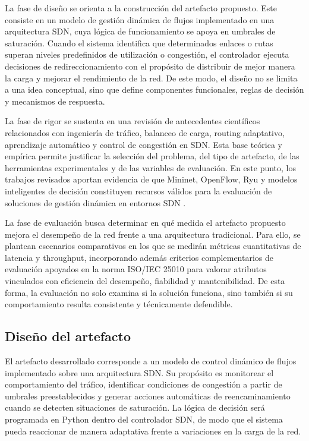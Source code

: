 \documentclass[12pt,a4paper]{article}
\begin{document}
La fase de diseño se orienta a la construcción del artefacto propuesto. Este consiste en un modelo de gestión dinámica de flujos implementado en una arquitectura SDN, cuya lógica de funcionamiento se apoya en umbrales de saturación. Cuando el sistema identifica que determinados enlaces o rutas superan niveles predefinidos de utilización o congestión, el controlador ejecuta decisiones de redireccionamiento con el propósito de distribuir de mejor manera la carga y mejorar el rendimiento de la red. De este modo, el diseño no se limita a una idea conceptual, sino que define componentes funcionales, reglas de decisión y mecanismos de respuesta.

La fase de rigor se sustenta en una revisión de antecedentes científicos relacionados con ingeniería de tráfico, balanceo de carga, routing adaptativo, aprendizaje automático y control de congestión en SDN. Esta base teórica y empírica permite justificar la selección del problema, del tipo de artefacto, de las herramientas experimentales y de las variables de evaluación. En este punto, los trabajos revisados aportan evidencia de que Mininet, OpenFlow, Ryu y modelos inteligentes de decisión constituyen recursos válidos para la evaluación de soluciones de gestión dinámica en entornos SDN \parencite{ddqn_sdn, cognitive_routing_sdn, controller_assignment_sdn, qos_lb_sdn}.

La fase de evaluación busca determinar en qué medida el artefacto propuesto mejora el desempeño de la red frente a una arquitectura tradicional. Para ello, se plantean escenarios comparativos en los que se medirán métricas cuantitativas de latencia y throughput, incorporando además criterios complementarios de evaluación apoyados en la norma ISO/IEC 25010 para valorar atributos vinculados con eficiencia del desempeño, fiabilidad y mantenibilidad. De esta forma, la evaluación no solo examina si la solución funciona, sino también si su comportamiento resulta consistente y técnicamente defendible.

\subsection{Diseño del artefacto}

El artefacto desarrollado corresponde a un modelo de control dinámico de flujos implementado sobre una arquitectura SDN. Su propósito es monitorear el comportamiento del tráfico, identificar condiciones de congestión a partir de umbrales preestablecidos y generar acciones automáticas de reencaminamiento cuando se detecten situaciones de saturación. La lógica de decisión será programada en Python dentro del controlador SDN, de modo que el sistema pueda reaccionar de manera adaptativa frente a variaciones en la carga de la red.
\end{document}
